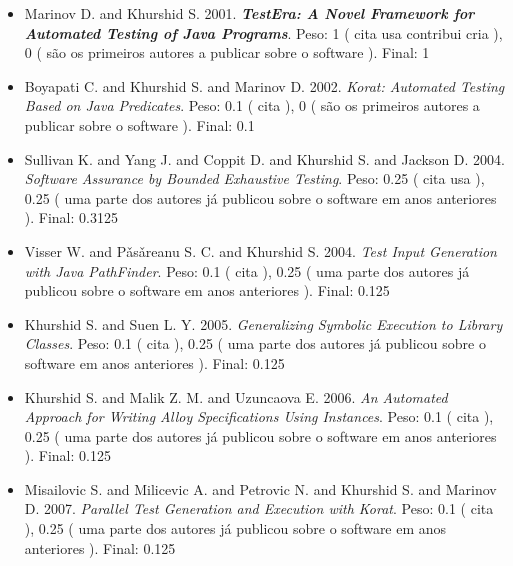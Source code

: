 \begin{itemize}
\item Marinov D. and Khurshid S.
      2001.
        \textbf{\textit{ TestEra: A Novel Framework for Automated Testing of Java Programs}}.
      Peso:
      1 (
          cita
          usa
          contribui
          cria
      ),
      0 (
são os primeiros autores a publicar sobre o software
      ).
      Final:
      1

\item Boyapati C. and Khurshid S. and Marinov D.
      2002.
        \textit{ Korat: Automated Testing Based on Java Predicates}.
      Peso:
      0.1 (
          cita
      ),
      0 (
são os primeiros autores a publicar sobre o software
      ).
      Final:
      0.1

\item Sullivan K. and Yang J. and Coppit D. and Khurshid S. and Jackson D.
      2004.
        \textit{ Software Assurance by Bounded Exhaustive Testing}.
      Peso:
      0.25 (
          cita
          usa
      ),
      0.25 (
uma parte dos autores já publicou sobre o software em anos anteriores
      ).
      Final:
      0.3125

\item Visser W. and P\v{a}s\v{a}reanu S. C. and Khurshid S.
      2004.
        \textit{ Test Input Generation with Java PathFinder}.
      Peso:
      0.1 (
          cita
      ),
      0.25 (
uma parte dos autores já publicou sobre o software em anos anteriores
      ).
      Final:
      0.125

\item Khurshid S. and Suen L. Y.
      2005.
        \textit{ Generalizing Symbolic Execution to Library Classes}.
      Peso:
      0.1 (
          cita
      ),
      0.25 (
uma parte dos autores já publicou sobre o software em anos anteriores
      ).
      Final:
      0.125

\item Khurshid S. and Malik Z. M. and Uzuncaova E.
      2006.
        \textit{ An Automated Approach for Writing Alloy Specifications Using Instances}.
      Peso:
      0.1 (
          cita
      ),
      0.25 (
uma parte dos autores já publicou sobre o software em anos anteriores
      ).
      Final:
      0.125

\item Misailovic S. and Milicevic A. and Petrovic N. and Khurshid S. and Marinov D.
      2007.
        \textit{ Parallel Test Generation and Execution with Korat}.
      Peso:
      0.1 (
          cita
      ),
      0.25 (
uma parte dos autores já publicou sobre o software em anos anteriores
      ).
      Final:
      0.125


\end{itemize}

